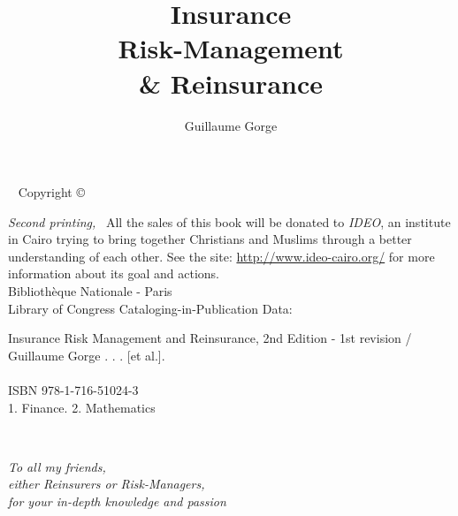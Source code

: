 \documentclass[justified,marginals=raggedright,notoc]{tufte-book}
\title{Insurance \\
{Risk-Management} \\
\& Reinsurance}
\author[Guillaume Gorge]{Guillaume Gorge}
\begin{document}
\frontmatter






\maketitle


\newpage
\begin{fullwidth}
~\vfill
\thispagestyle{empty}
\setlength{\parindent}{0pt}
\setlength{\parskip}{\baselineskip}
Copyright \copyright\ \the\year\ \thanklessauthor
\par\textit{Second printing, \monthyear}
\scriptsize\parindent=0pt\vskip8pt
\
All the sales of this book will be donated to \textit{IDEO}, an institute in Cairo trying to bring together Christians and Muslims through a better understanding of each other. See the site: \url{http://www.ideo-cairo.org/} for more information about its goal and actions. \\
\vskip10pt
{ Bibliothèque Nationale - Paris
\\ Library of Congress Cataloging-in-Publication Data:}
\vskip8pt

Insurance Risk Management and Reinsurance, 2nd Edition - 1st revision / Guillaume Gorge . . . [et al.].
\\
\\    ISBN 978-1-716-51024-3
\\    1. Finance.  2. Mathematics 
\

\cleardoublepage
~\vfill
\begin{doublespace}
\noindent\fontsize{18}{22}\selectfont\itshape
\nohyphenation
To all my friends,\\
either Reinsurers or Risk-Managers,\\
for your in-depth knowledge and passion
\end{doublespace}
\vfill
\vfill




\end{fullwidth}
\setcounter{page}{1}
\begin{fullwidth}
\tableofcontents
\end{fullwidth}
\end{document}
